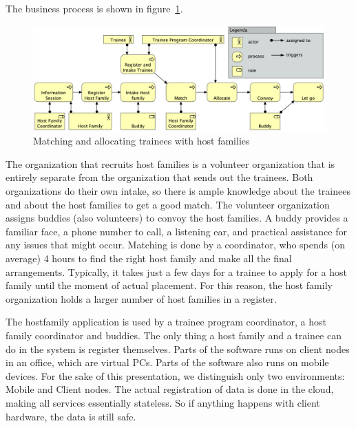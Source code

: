 \documentclass[sn-vancouver]{sn-jnl}%
\begin{document}
The business process is shown in figure~\ref{fig: Business Process voor Uitvoering}.
\begin{figure}[b]
\centering
  \includegraphics[clip=true, scale=0.245]{Business Process voor Uitvoering.png}
\caption{Matching and allocating trainees with host families}
\label{fig: Business Process voor Uitvoering}
\end{figure}
The organization that recruits host families is a volunteer organization that is entirely separate from the organization that sends out the trainees.
Both organizations do their own intake, so there is ample knowledge about the trainees and about the host families to get a good match.
The volunteer organization assigns buddies (also volunteers) to convoy the host families.
A buddy provides a familiar face, a phone number to call, a listening ear, and practical assistance for any issues that might occur.
Matching is done by a coordinator, who spends (on average) 4 hours to find the right host family and make all the final arrangements.
Typically, it takes just a few days for a trainee to apply for a host family until the moment of actual placement.
For this reason, the host family organization holds a larger number of host families in a register.

The hostfamily application is used by a trainee program coordinator, a host family coordinator and buddies.
The only thing a host family and a trainee can do in the system is register themselves.
Parts of the software runs on client nodes in an office, which are virtual PCs.
Parts of the software also runs on mobile devices.
For the sake of this presentation, we distinguish only two environments: Mobile and Client nodes.
The actual registration of data is done in the cloud, making all services essentially stateless.
So if anything happens with client hardware, the data is still safe.
\end{document}
